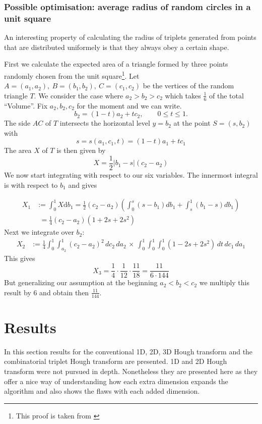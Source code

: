 \documentclass[11pt,twoside]{scrreprt}
\begin{document}

\subsection{Possible optimisation: average radius of random circles in a unit square} %
\label{ssub:average_radius_of_random_circles_in_a_unit_square}
An interesting property of calculating the radius of triplets generated from points that are distributed uniformely is that they always obey a certain shape.

First we calculate the expected area of a triangle formed by three points randomly chosen from the unit square\footnote{This proof is taken from \cite{Blatter:2015}}. Let \( A = (a_1, a_2),\ B = (b_1, b_2),\ C = (c_1, c_2)\) be the vertices of the random triangle \( T \). We consider the case where \( a_2
> b_2 > c_2 \) which takes $\frac{1}{6}$ of the total ``Volume''. Fix \( a_2, b_2, c_2 \) for the moment and we can write.
\[
  b_2 = (1-t)a_2 + tc_2, \qquad 0 \leq t \leq 1.
\]
The side $AC$ of $T$ intersects the horizontal level $y=b_2$ at the point $S=(s,b_2)$ with
\begin{equation}
  s = s(a_1,c_1,t) = (1-t)a_1 + tc_1
\end{equation}
The area $X$ of $T$ is then given by
\[
  X = \frac{1}{2}\lvert b_1 - s\rvert(c_2 - a_2)
\]
We now start integrating with respect to our six variables. The innermost integral is with respect to $b_1$ and gives

\begin{align}
  X_1 &:= \int_0^1X\text{d}b_1=\frac{1}{2}(c_2-a_2)\left( \int_0^s(s-b_1)db_1 + \int_s^1(b_1-s)db_1\right)\nonumber\\
      &\phantom{:}= \frac{1}{4}(c_2-a_2)(1+2s+2s^2)\nonumber
\end{align}
Next we integrate over $b_2$:
\begin{align}
  X_2 &:= \frac{1}{4}\int_0^1\int_{a_2}^1(c_2-a_2)^2\,dc_2\,da_2\,\times\,\int_0^1\int_0^1\int_0^1(1-2s+2s^2)\,dt\,dc_1\,da_1  \nonumber
\end{align}
This gives
\[
  X_3 = \frac{1}{4}\cdot \frac{1}{12} \cdot \frac{11}{18} = \frac{11}{6\cdot144}
\]
But generalizing our assumption at the beginning $a_2 < b_2 < c_2$ we multiply this result by $6$ and obtain then $\frac{11}{144}$.

\chapter{Results}
\label{cha:results}
In this section results for the conventional 1D, 2D, 3D Hough transform and the combinatorial triplet Hough transform are presented. 1D and 2D Hough transform
were not pursued in depth. Nonetheless they are presented here as they offer a nice
way of understanding how each extra dimension expands the algorithm and also
shows the flaws with each added dimension.
\end{document}
